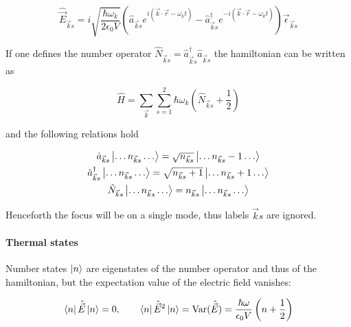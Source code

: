 \documentclass[a4paper, 11pt]{article}
\begin{document}
      \begin{equation} \label{eq:E}
        \hat{\vec{E}}_{\vec{k}s} = i \sqrt{\frac{\hbar\omega_k}{2\epsilon_0V}} \left(\hat{a}_{\vec{k}s}e^{i(\vec{k}\cdot\vec{r} - \omega_kt)} - \hat{a}_{\vec{k}s}^\dagger e^{-i(\vec{k}\cdot\vec{r} - \omega_kt)} \right) \vec{\epsilon}_{\vec{k}s}
      \end{equation}

      If one defines the number operator $\hat{N}_{\vec{k}s} = \hat{a}_{\vec{k}s}^\dagger \hat{a}_{\vec{k}s}$ the hamiltonian can be written as

      \begin{equation*}
          \hat{H} = \sum_{\vec{k}} \sum_{s = 1}^2 \hbar \omega_k \left(\hat{N}_{\vec{k}s} + \frac{1}{2} \right)
      \end{equation*}

      and the following relations hold

      \begin{gather*}
        \hat{a}_{\vec{k}s} \ket{\dots n_{\vec{k}s} \dots} = \sqrt{n_{\vec{k}s}} \ket{\dots n_{\vec{k}s} - 1 \dots} \\
        \hat{a}_{\vec{k}s}^\dagger \ket{\dots n_{\vec{k}s} \dots} = \sqrt{n_{\vec{k}s} + 1} \ket{\dots n_{\vec{k}s} + 1 \dots} \\
        \hat{N}_{\vec{k}s} \ket{\dots n_{\vec{k}s} \dots} = n_{\vec{k}s} \ket{\dots n_{\vec{k}s} \dots}
      \end{gather*}

      Henceforth the focus will be on a single mode, thus labels $\vec{k}s$ are ignored.



    \paragraph{Thermal states}
      Number states $\ket{n}$ are eigenstates of the number operator and thus of the hamiltonian, but the expectation value of the electric field vanishes:

      \begin{equation*}
        \bra{n} \hat{\vec{E}} \ket{n} = 0, \qquad \bra{n} \hat{\vec{E}}^2 \ket{n} = \text{Var}(\hat{\vec{E}}) = \frac{\hbar\omega}{\epsilon_0V}\left(n + \frac{1}{2} \right)
      \end{equation*}
\end{document}
